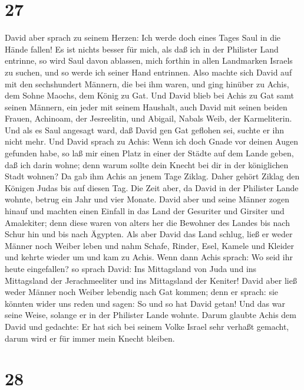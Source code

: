 \hypertarget{section-26}{%
\section{27}\label{section-26}}

 David aber sprach zu seinem Herzen: Ich werde doch eines
Tages Saul in die Hände fallen! Es ist nichts besser für mich, als daß
ich in der Philister Land entrinne, so wird Saul davon ablassen, mich
forthin in allen Landmarken Israels zu suchen, und so werde ich seiner
Hand entrinnen.  Also machte sich David auf mit den
sechshundert Männern, die bei ihm waren, und ging hinüber zu Achis, dem
Sohne Maochs, dem König zu Gat.  Und David blieb bei Achis
zu Gat samt seinen Männern, ein jeder mit seinem Haushalt, auch David
mit seinen beiden Frauen, Achinoam, der Jesreelitin, und Abigail, Nabals
Weib, der Karmeliterin.  Und als es Saul angesagt ward,
daß David gen Gat geflohen sei, suchte er ihn nicht mehr. 
Und David sprach zu Achis: Wenn ich doch Gnade vor deinen Augen gefunden
habe, so laß mir einen Platz in einer der Städte auf dem Lande geben,
daß ich darin wohne; denn warum sollte dein Knecht bei dir in der
königlichen Stadt wohnen?  Da gab ihm Achis an jenem Tage
Ziklag. Daher gehört Ziklag den Königen Judas bis auf diesen Tag.
 Die Zeit aber, da David in der Philister Lande wohnte,
betrug ein Jahr und vier Monate.  David aber und seine
Männer zogen hinauf und machten einen Einfall in das Land der Gesuriter
und Girsiter und Amalekiter; denn diese waren von alters her die
Bewohner des Landes bis nach Schur hin und bis nach Ägypten.
 Als aber David das Land schlug, ließ er weder Männer noch
Weiber leben und nahm Schafe, Rinder, Esel, Kamele und Kleider und
kehrte wieder um und kam zu Achis.  Wenn dann Achis
sprach: Wo seid ihr heute eingefallen? so sprach David: Ins Mittagsland
von Juda und ins Mittagsland der Jerachmeeliter und ins Mittagsland der
Keniter!  David aber ließ weder Männer noch Weiber
lebendig nach Gat kommen; denn er sprach: sie könnten wider uns reden
und sagen: So und so hat David getan! Und das war seine Weise, solange
er in der Philister Lande wohnte.  Darum glaubte Achis
dem David und gedachte: Er hat sich bei seinem Volke Israel sehr verhaßt
gemacht, darum wird er für immer mein Knecht bleiben.

\hypertarget{section-27}{%
\section{28}\label{section-27}}

